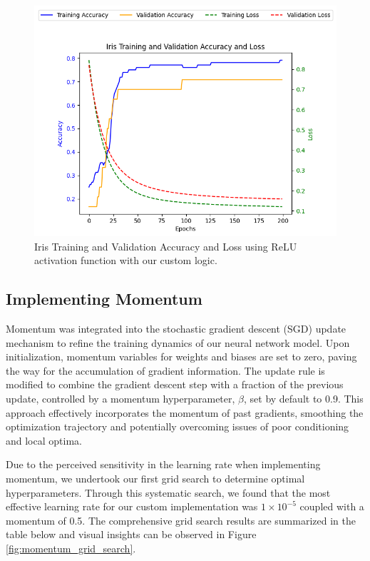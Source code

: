 \documentclass[letterpaper]{article}
\begin{document}
\begin{figure}[h]
    \centering
    \includegraphics[width=0.8\linewidth]{iris_relu_custom.png} %
    \caption{Iris Training and Validation Accuracy and Loss using ReLU activation function with our custom logic.}
    \label{fig:iris_graph}
\end{figure}


\subsection{Implementing Momentum}
\label{subsec:momentum}
Momentum was integrated into the stochastic gradient descent (SGD) update mechanism to refine the training dynamics of our neural network model. Upon initialization, momentum variables for weights and biases are set to zero, paving the way for the accumulation of gradient information. The update rule is modified to combine the gradient descent step with a fraction of the previous update, controlled by a momentum hyperparameter, $ \beta $, set by default to 0.9. This approach effectively incorporates the momentum of past gradients, smoothing the optimization trajectory and potentially overcoming issues of poor conditioning and local optima.

Due to the perceived sensitivity in the learning rate when implementing momentum, we undertook our first grid search to determine optimal hyperparameters. Through this systematic search, we found that the most effective learning rate for our custom implementation was $1 \times 10^{-5}$ coupled with a momentum of 0.5. The comprehensive grid search results are summarized in the table below and visual insights can be observed in Figure \ref{fig:momentum_grid_search}.
\end{document}
